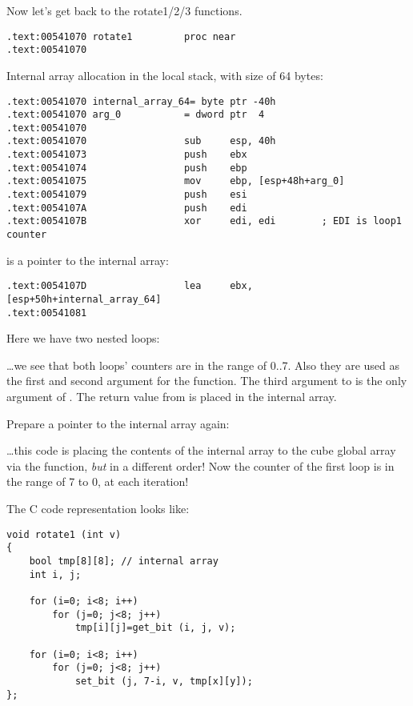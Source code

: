 Now let's get back to the rotate1/2/3 functions.

\begin{lstlisting}[style=customasmx86]
.text:00541070 rotate1         proc near
.text:00541070
\end{lstlisting}

Internal array allocation in the local stack, with size of 64 bytes:

\begin{lstlisting}[style=customasmx86]
.text:00541070 internal_array_64= byte ptr -40h
.text:00541070 arg_0           = dword ptr  4
.text:00541070
.text:00541070                 sub     esp, 40h
.text:00541073                 push    ebx
.text:00541074                 push    ebp
.text:00541075                 mov     ebp, [esp+48h+arg_0]
.text:00541079                 push    esi
.text:0054107A                 push    edi
.text:0054107B                 xor     edi, edi        ; EDI is loop1 counter
\end{lstlisting}

\EBX is a pointer to the internal array:

\begin{lstlisting}[style=customasmx86]
.text:0054107D                 lea     ebx, [esp+50h+internal_array_64]
.text:00541081
\end{lstlisting}

Here we have two nested loops:



\dots we see that both loops' counters are in the range of 0..7. 
Also they are used as the first and second argument for the  function.
The third argument to  is the only argument of . 
The return value from  is placed in the internal array.

Prepare a pointer to the internal array again:



\dots this code is placing the contents of the internal array to the cube global array via the  function, 
\emph{but} in a different order!
Now the counter of the first loop is in the range of 7 to 0,  at each iteration!

The C code representation looks like:

\begin{lstlisting}[style=customc]
void rotate1 (int v)
{
	bool tmp[8][8]; // internal array
	int i, j;

	for (i=0; i<8; i++)
		for (j=0; j<8; j++)
			tmp[i][j]=get_bit (i, j, v);

	for (i=0; i<8; i++)
		for (j=0; j<8; j++)
			set_bit (j, 7-i, v, tmp[x][y]);
};
\end{lstlisting}

